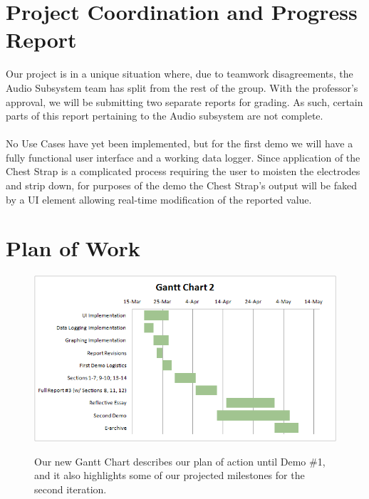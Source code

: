 \documentclass[letterpaper,english, 12pt]{scrreprt}
\begin{document}
\section{Project Coordination and Progress Report}
Our project is in a unique situation where, due to teamwork disagreements, the Audio Subsystem team has split from the rest of the group.
With the professor's approval, we will be submitting two separate reports for grading.
As such, certain parts of this report pertaining to the Audio subsystem are not complete.
\\
\\
No Use Cases have yet been implemented, but for the first demo we will have a fully functional user interface and a working data logger.
Since application of the Chest Strap is a complicated process requiring the user to moisten the electrodes and strip down, for purposes of the demo the Chest Strap's output will be faked by a UI element allowing real-time modification of the reported value.

\section{Plan of Work}
\begin{figure}[H]
	\centering
	\includegraphics{img/Gantt_Chart2.png}\\
	\caption{Our new Gantt Chart describes our plan of action until Demo \#1, and it also highlights some of our projected milestones for the second iteration.} 
\end{figure}
\end{document}
